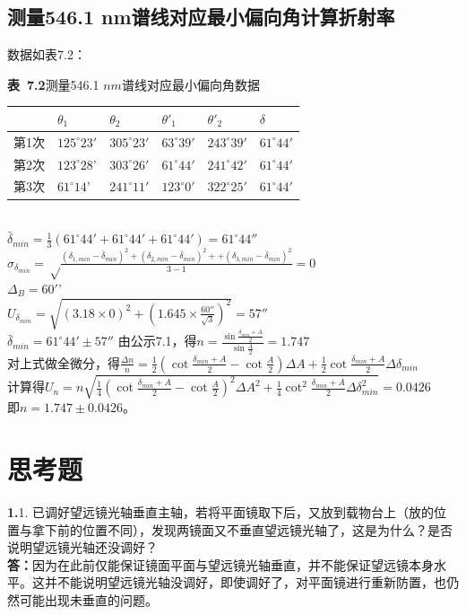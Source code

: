 \documentclass{article}
\def\kong{\hspace*{2em}}
\begin{document}
    \subsection{测量546.1 nm谱线对应最小偏向角计算折射率}
        \kong 数据如表7.2：\\[12pt]
        \begin{minipage}{1\linewidth}
            \centering
            \textbf{表\ 7.2}\quad  测量546.1 $nm$谱线对应最小偏向角数据 \\[4pt]
            \begin{tabular}{|l|l|l|l|l|l|}
                \hline
                    & $\theta_1$       & $\theta_2$       & $\theta'_1$     & $\theta'_2$      & $\delta$        \\ \hline
                第1次 & $125^{\circ}23'$ & $305^{\circ}23'$ & $63^{\circ}39'$ & $243^{\circ}39'$ & $61^{\circ}44'$ \\ \hline
                第2次 & $123^{\circ}28$' & $303^{\circ}26'$ & $61^{\circ}44'$ & $241^{\circ}42'$ & $61^{\circ}44'$ \\ \hline
                第3次 & $61^{\circ}14$'  & $241^{\circ}11'$ & $123^{\circ}0'$ & $322^{\circ}25'$ & $61^{\circ}44'$ \\ \hline
                \end{tabular} 
        \end{minipage}\\[12pt]
        \kong $\displaystyle \bar \delta_{min}=\frac{1}{3}(61^{\circ}44'+61^{\circ}44'+61^{\circ}44')=61^{\circ}44''$\\
        \kong $\displaystyle \sigma_{\delta_{min}}=\sqrt \frac{(\delta_{1,min}-\bar \delta_{min})^2+(\delta_{2,min}-\bar \delta_{min})^2++(\delta_{3,min}-\bar \delta_{min})^2}{3-1}=0$\\
        \kong $\Delta_B=60'’$\\
        \kong $\displaystyle  U_{\delta_{min}}=\sqrt {(3.18\times 0)^2+(1.645\times \frac{60''}{\sqrt 3})^2}=57''$\\
        \kong $\bar \delta_{min}=61^{\circ}44'\pm 57''$
        \kong 由公示7.1，得$\displaystyle n=\frac{\sin \displaystyle\frac{\delta _{min}+A}{2}}{\sin \displaystyle\frac A 2}=1.747$\\
        \kong 对上式做全微分，得$\displaystyle \frac{\Delta n}{n}=\frac 1 2(\cot\frac{\delta _{min}+A}{2}-\cot\frac A 2)\Delta A+\frac 1 2 \cot\frac{\delta _{min}+A}{2}\Delta \delta_{min}$\\
        \kong 计算得$\displaystyle U_{n}=n\sqrt{\frac 1 4(\cot\frac{\delta _{min}+A}{2}-\cot\frac A 2)^2\Delta A^2+\frac 1 4 \cot^2\frac{\delta _{min}+A}{2}\Delta \delta_{min}^2}=0.0426$\\
        \kong 即$n=1.747\pm 0.0426$。
        
        
\section{思考题}
    \kong \textbf{1.}1. 已调好望远镜光轴垂直主轴，若将平面镜取下后，又放到载物台上（放的位置与拿下前的位置不同），发现两镜面又不垂直望远镜光轴了，这是为什么？是否说明望远镜光轴还没调好？\\
    \kong \textbf{答：}因为在此前仅能保证镜面平面与望远镜光轴垂直，并不能保证望远镜本身水平。这并不能说明望远镜光轴没调好，即使调好了，对平面镜进行重新防置，也仍然可能出现未垂直的问题。
\end{document}
